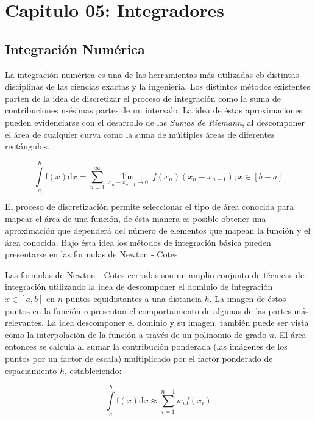 \documentclass[letterpaper,10pt,oneside]{sphinxmanual}
\theoremstyle{plain}%
\theoremstyle{definition}%
\theoremstyle{remark}%
\begin{document}
\chapter{Capitulo 05: Integradores}
\label{chapter05::doc}\label{chapter05:capitulo-05-integradores}

\section{Integración Numérica}
\label{chapter05:Integración Numérica}
La integración numérica es una de las herramientas más utilizadas eb distintas disciplinas de las ciencias exactas y la ingeniería. Los distintos métodos existentes parten de la idea de discretizar el proceso de integración como la suma de contribuciones n-ésimas partes de un intervalo. La idea de éstas aproximaciones pueden evidenciarse con el desarrollo de las \textit{Sumas de Riemann}, al descomponer el área de cualquier curva como la suma de múltiples áreas de diferentes rectángulos.

\begin{equation}
\int\limits_{a}^{b} \mathrm{f}(x)\mathrm{d}x = \sum\limits_{n=1}^{\infty} \lim_{x_{n} - x_{n-1}\to 0}\ f(x_{n})(x_{n} - x_{n-1}); x\in[b - a]
\end{equation}

El proceso de discretización permite seleccionar el tipo de área conocida para mapear el área de una función, de ésta manera es posible obtener una aproximación que dependerá del número de elementos que mapean la función y el área conocida. Bajo ésta idea los métodos de integración básica pueden presentarse en las formulas de Newton - Cotes.

Las formulas de Newton - Cotes cerradas son un amplio conjunto de técnicas de integración utilizando la idea de descomponer el dominio de integración $x\in[a, b]$ en $n$ puntos equidistantes a una distancia $h$. La imagen de éstos puntos en la función representan el comportamiento de algunas de las partes más relevantes. La idea descomponer el dominio y su imagen, también puede ser vista como la interpolación de la función a través de un polinomio de grado $n$. El área entonces se calcula al sumar la contribución ponderada (las imágenes de los puntos por un factor de escala) multiplicado por el factor ponderado de espaciamiento $h$, estableciendo:

\begin{equation}
\int\limits_{a}^{b} \mathrm{f}(x)\mathrm{d}x \approx \sum\limits_{i=1}^{n-1} w_{i}f(x_{i})
\end{equation}
\end{document}
